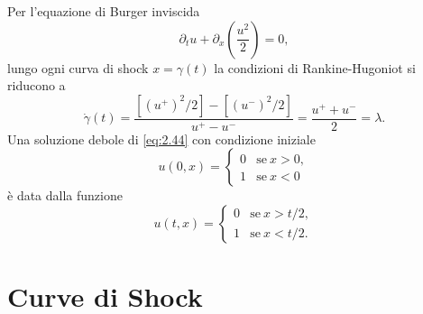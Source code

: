 \begin{esempio}
    Per l'equazione di Burger inviscida
    \begin{equation}\label{eq:2.44}
        \partial_{t}u+\partial_{x}\left(\frac{u^{2}}{2}\right)=0,
    \end{equation}
    lungo ogni curva di shock $x=\gamma(t)$ la condizioni di Rankine-Hugoniot si riducono a
    \begin{equation}\label{eq:2.45}
        \dot{\gamma}(t)=\frac{[(u^{+})^{2}/2]-[(u^{-})^{2}/2]}{u^{+}-u^{-}}=\frac{u^{+}+u^{-}}{2}=\lambda.
    \end{equation}
    Una soluzione debole di \eqref{eq:2.44} con condizione iniziale
    \begin{equation}\label{eq:2.46}
        u(0,x) = 
        \begin{cases}
            0 & \text{se} \ x>0, \\
            1 & \text{se} \ x<0
        \end{cases}
    \end{equation}
    è data dalla funzione
    \begin{equation}\label{eq:2.47}
        u(t,x) = 
        \begin{cases}
            0 & \text{se} \ x > t/2, \\
            1 & \text{se} \ x < t/2.
        \end{cases}
    \end{equation}
\end{esempio}


\section{Curve di Shock}

